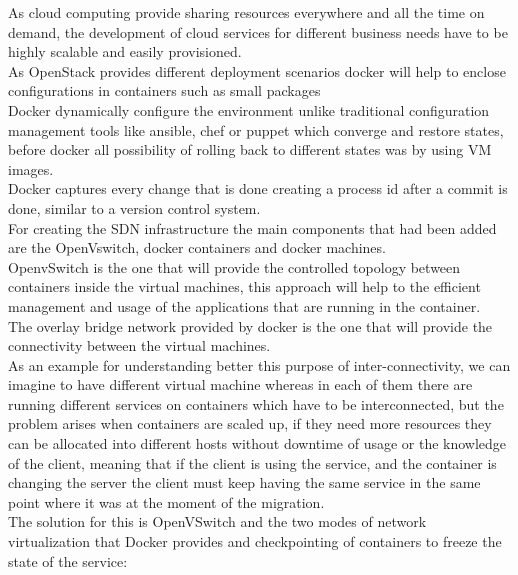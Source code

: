 As cloud computing provide sharing resources everywhere and all the time on demand, the development of cloud services for different business needs have to be highly scalable and easily provisioned. \\

As OpenStack provides different deployment scenarios docker will help to enclose configurations in containers such as small packages\\ 

Docker dynamically configure the environment unlike traditional configuration management tools like ansible, chef or puppet which converge and restore states, before docker all possibility of rolling back to different states was by using VM images.\\ 

Docker captures every change that is done creating a process id after a commit is done, similar to a version control system.\cite{2}\\
   
For creating the SDN infrastructure the main components that had been added are the OpenVswitch, docker containers and docker machines.\\ 

OpenvSwitch is the one that will provide the controlled topology between containers inside the virtual machines, this approach will help to the efficient management and usage of the applications that are running in the container.\\ 

The overlay bridge network provided by docker is the one that will provide the connectivity between the virtual machines.\\

As an example for understanding better this purpose of inter-connectivity, we can imagine to have different virtual machine whereas in each of them there are running different services on containers which have to be interconnected, but the problem arises when containers are scaled up, if they need more resources they can be allocated into different hosts without downtime of usage or the knowledge of the client, meaning that if the client is using the service, and the container is changing the server the client must keep having the same service in the same point where it was at the moment of the migration. \\

The solution for this is OpenVSwitch and the two modes of network virtualization that Docker provides and checkpointing of containers to freeze the state of the service: \\

